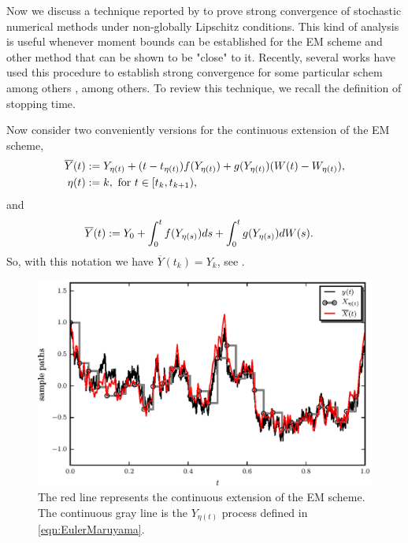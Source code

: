 	Now we discuss a technique  reported  by  \citet*{Higham2002b} to prove strong convergence 
of stochastic numerical methods under non-globally Lipschitz conditions.
This kind of analysis is useful whenever moment bounds can be established for the EM scheme and 
other method that can be shown to be "close" to it. Recently, several works have used this procedure to establish 
strong convergence for some particular schem among others
\cite{Beyn2010, Guo2014, Hutzenthaler2015, Hutzenthaler2012a,Hutzenthaler2010,Lamba2007,Mao2013,Tretyakov2013}, among
others. To review this technique, we recall the definition of stopping time. 

Now consider two conveniently versions for the continuous extension of the EM 
scheme,
\begin{align}\label{eqn:EMContinuousExtension}
	\overline{Y}(t)&:=
		Y_{\eta(t)} + (t-t_{\eta(t)}) f(Y_{\eta(t)}) + g(Y_{\eta(t)})(W(t)-W_{\eta(t)}),\\
		\eta(t)&:=
			 k, \text{ for } t\in[t_k,t_{k+1}), \notag
\end{align}
and
\begin{align}
		\overline{Y}(t)
		&:=
			Y_0 + \int_{0}^t f(Y_{\eta(s)})ds + 
			\int_0^tg(Y_{\eta(s)})dW(s). \notag \label{eqn:EMIntegralContinuousExtension}
\end{align}
So, with this notation we have $\overline{Y}(t_k)=Y_k$, see .
%
\begin{figure}[h!]
	\centering
	\includegraphics{papers/paperB/sections/ContinuousExtPy/ContinuousExtension.eps}
	\caption{
		The red line represents the continuous extension of the EM scheme. The continuous gray line is the 
		$Y_{\eta(t)}$ 
		process defined in \eqref{eqn:EulerMaruyama}.
	}
	\label{fig:ContinuousExtension}
\end{figure}
